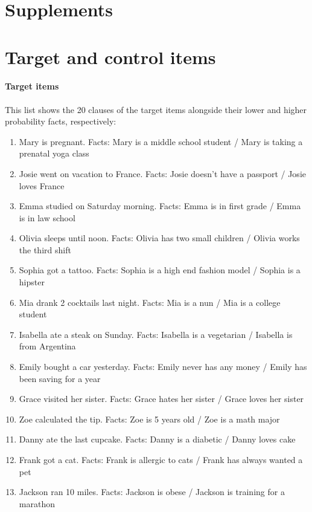 \documentclass[11pt,fleqn]{article}
\newcommand{\6}{\mbox{$[\hspace*{-.6mm}[$}}
\newcommand{\9}{\mbox{$]\hspace*{-.6mm}]$}}
\begin{document}
\section*{Supplements}

\section{Target and control items}\label{a-stim}

\paragraph{Target items} This list shows the 20 clauses of the target items alongside their lower and higher probability facts, respectively:

\begin{enumerate}[leftmargin=4ex,itemsep=-2pt]
\item Mary is pregnant. Facts: Mary is a middle school student / Mary is taking a prenatal yoga class
\item Josie went on vacation to France. Facts:  Josie doesn't have a passport / Josie loves France 
\item Emma studied on Saturday morning. Facts: Emma is in first grade / Emma is in law school 
\item Olivia sleeps until noon. Facts: Olivia has two small children / Olivia works the third shift
\item Sophia got a tattoo. Facts: Sophia is a high end fashion model / Sophia is a hipster
\item Mia drank 2 cocktails last night. Facts: Mia is a nun / Mia is a college student
\item Isabella ate a steak on Sunday. Facts: Isabella is a vegetarian / Isabella is from Argentina
\item Emily bought a car yesterday. Facts: Emily never has any money / Emily has been saving for a year
\item Grace visited her sister. Facts: Grace hates her sister / Grace loves her sister
\item Zoe calculated the tip. Facts: Zoe is 5 years old / Zoe is a math major
\item Danny ate the last cupcake. Facts: Danny is a diabetic / Danny loves cake
\item Frank got a cat. Facts: Frank is allergic to cats / Frank has always wanted a pet
\item Jackson ran 10 miles. Facts: Jackson is obese / Jackson is training for a marathon

\end{enumerate}
\end{document}
